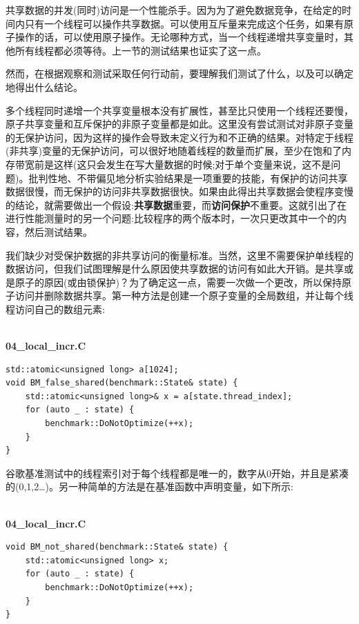 共享数据的并发(同时)访问是一个性能杀手。因为为了避免数据竞争，在给定的时间内只有一个线程可以操作共享数据。可以使用互斥量来完成这个任务，如果有原子操作的话，可以使用原子操作。无论哪种方式，当一个线程递增共享变量时，其他所有线程都必须等待。上一节的测试结果也证实了这一点。

然而，在根据观察和测试采取任何行动前，要理解我们测试了什么，以及可以确定地得出什么结论。

多个线程同时递增一个共享变量根本没有扩展性，甚至比只使用一个线程还要慢，原子共享变量和互斥保护的非原子变量都是如此。这里没有尝试测试对非原子变量的无保护访问，因为这样的操作会导致未定义行为和不正确的结果。对特定于线程(非共享)变量的无保护访问，可以很好地随着线程的数量而扩展，至少在饱和了内存带宽前是这样(这只会发生在写大量数据的时候;对于单个变量来说，这不是问题)。批判性地、不带偏见地分析实验结果是一项重要的技能，有保护的访问共享数据很慢，而无保护的访问非共享数据很快。如果由此得出共享数据会使程序变慢的结论，就需要做出一个假设:\textbf{共享数据}重要，而\textbf{访问保护}不重要。这就引出了在进行性能测量时的另一个问题:比较程序的两个版本时，一次只更改其中一个的内容，然后测试结果。

我们缺少对受保护数据的非共享访问的衡量标准。当然，这里不需要保护单线程的数据访问，但我们试图理解是什么原因使共享数据的访问有如此大开销。是共享或是原子的原因(或由锁保护)？为了确定这一点，需要一次做一个更改，所以保持原子访问并删除数据共享。第一种方法是创建一个原子变量的全局数组，并让每个线程访问自己的数组元素:

\hspace*{\fill} \\ %
\noindent
\textbf{04\_local\_incr.C}
\begin{lstlisting}[style=styleCXX]
std::atomic<unsigned long> a[1024];
void BM_false_shared(benchmark::State& state) {
	std::atomic<unsigned long>& x = a[state.thread_index];
	for (auto _ : state) {
		benchmark::DoNotOptimize(++x);
	}
}
\end{lstlisting}

谷歌基准测试中的线程索引对于每个线程都是唯一的，数字从0开始，并且是紧凑的(0,1,2…)。另一种简单的方法是在基准函数中声明变量，如下所示:

\hspace*{\fill} \\ %
\noindent
\textbf{04\_local\_incr.C}
\begin{lstlisting}[style=styleCXX]
void BM_not_shared(benchmark::State& state) {
	std::atomic<unsigned long> x;
	for (auto _ : state) {
		benchmark::DoNotOptimize(++x);
	}
}
\end{lstlisting}

